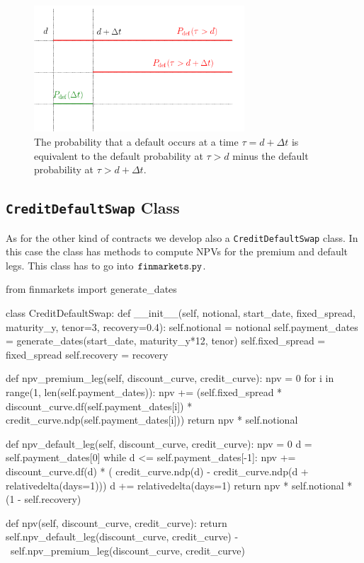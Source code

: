 \begin{figure}[htb]
\centering
\includegraphics[width=0.7\textwidth]{figures/timeline.png}
\caption{The probability that a default occurs at a time $\tau = d+\Delta t$ is equivalent to the default probability at $\tau > d$ minus the default probability at $\tau>d+\Delta t$.}
\label{fig:default_p}
\end{figure}

\subsection{\texttt{CreditDefaultSwap} Class}

\begin{finmarkets}
As for the other kind of contracts we develop also a \texttt{CreditDefaultSwap} class. In this case the class has methods to compute NPVs for the premium and default legs. This class has to go into $\tt{finmarkets.py}$.
\end{finmarkets}

\begin{ipython}
from finmarkets import generate_dates

class CreditDefaultSwap:
    def __init__(self, notional, start_date, fixed_spread,
                 maturity_y, tenor=3, recovery=0.4):
        self.notional = notional
        self.payment_dates = generate_dates(start_date,
                                            maturity_y*12, tenor)
        self.fixed_spread = fixed_spread
        self.recovery = recovery

    def npv_premium_leg(self, discount_curve, credit_curve):
        npv = 0
        for i in range(1, len(self.payment_dates)):
            npv += (self.fixed_spread *
                    discount_curve.df(self.payment_dates[i]) *
                    credit_curve.ndp(self.payment_dates[i]))
        return npv * self.notional

    def npv_default_leg(self, discount_curve, credit_curve):
        npv = 0
        d = self.payment_dates[0]
        while d <= self.payment_dates[-1]:
            npv += discount_curve.df(d) * (
                   credit_curve.ndp(d) -
                   credit_curve.ndp(d + relativedelta(days=1)))
            d += relativedelta(days=1)
        return npv * self.notional * (1 - self.recovery)

    def npv(self, discount_curve, credit_curve):
        return self.npv_default_leg(discount_curve, credit_curve) - \
               self.npv_premium_leg(discount_curve, credit_curve)
\end{ipython}

